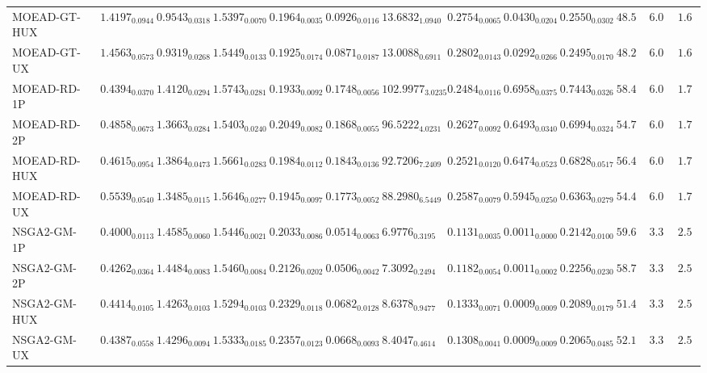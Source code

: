 \documentclass[11pt,a4paper]{article}
\begin{document}
\begin{table}[H]
{\begin{tabular}{lcccccccccccc}
MOEAD-GT-HUX & $1.4197_{0.0944}$ & $0.9543_{0.0318}$ & $1.5397_{0.0070}$ & $0.1964_{0.0035}$ & $0.0926_{0.0116}$ & $13.6832_{1.0940}$ & $0.2754_{0.0065}$ & $0.0430_{0.0204}$ & $0.2550_{0.0302}$ & $48.56$ & $6.00$ & $\mathbf{1.67}$ \\
MOEAD-GT-UX & $1.4563_{0.0573}$ & $0.9319_{0.0268}$ & $1.5449_{0.0133}$ & $0.1925_{0.0174}$ & $0.0871_{0.0187}$ & $13.0088_{0.6911}$ & $0.2802_{0.0143}$ & $0.0292_{0.0266}$ & $0.2495_{0.0170}$ & $48.22$ & $6.00$ & $\mathbf{1.67}$ \\
MOEAD-RD-1P & $0.4394_{0.0370}$ & $1.4120_{0.0294}$ & $1.5743_{0.0281}$ & $0.1933_{0.0092}$ & $0.1748_{0.0056}$ & $102.9977_{3.0235}$ & $0.2484_{0.0116}$ & $0.6958_{0.0375}$ & $0.7443_{0.0326}$ & $58.44$ & $6.00$ & $1.78$ \\
MOEAD-RD-2P & $0.4858_{0.0673}$ & $1.3663_{0.0284}$ & $1.5403_{0.0240}$ & $0.2049_{0.0082}$ & $0.1868_{0.0055}$ & $96.5222_{4.0231}$ & $0.2627_{0.0092}$ & $0.6493_{0.0340}$ & $0.6994_{0.0324}$ & $54.78$ & $6.00$ & $1.78$ \\
MOEAD-RD-HUX & $0.4615_{0.0954}$ & $1.3864_{0.0473}$ & $1.5661_{0.0283}$ & $0.1984_{0.0112}$ & $0.1843_{0.0136}$ & $92.7206_{7.2409}$ & $0.2521_{0.0120}$ & $0.6474_{0.0523}$ & $0.6828_{0.0517}$ & $56.44$ & $6.00$ & $1.78$ \\
MOEAD-RD-UX & $0.5539_{0.0540}$ & $1.3485_{0.0115}$ & $1.5646_{0.0277}$ & $0.1945_{0.0097}$ & $0.1773_{0.0052}$ & $88.2980_{6.5449}$ & $0.2587_{0.0079}$ & $0.5945_{0.0250}$ & $0.6363_{0.0279}$ & $54.44$ & $6.00$ & $1.78$ \\
NSGA2-GM-1P & $0.4000_{0.0113}$ & $1.4585_{0.0060}$ & $1.5446_{0.0021}$ & $0.2033_{0.0086}$ & $0.0514_{0.0063}$ & $6.9776_{0.3195}$ & $0.1131_{0.0035}$ & $\mathbf{0.0011}_{0.0000}$ & $0.2142_{0.0100}$ & $59.67$ & $3.33$ & $2.56$ \\
NSGA2-GM-2P & $0.4262_{0.0364}$ & $1.4484_{0.0083}$ & $1.5460_{0.0084}$ & $0.2126_{0.0202}$ & $0.0506_{0.0042}$ & $7.3092_{0.2494}$ & $0.1182_{0.0054}$ & $\mathbf{0.0011}_{0.0002}$ & $0.2256_{0.0230}$ & $58.78$ & $3.33$ & $2.56$ \\
NSGA2-GM-HUX & $0.4414_{0.0105}$ & $1.4263_{0.0103}$ & $1.5294_{0.0103}$ & $0.2329_{0.0118}$ & $0.0682_{0.0128}$ & $8.6378_{0.9477}$ & $0.1333_{0.0071}$ & $\mathbf{0.0009}_{0.0009}$ & $0.2089_{0.0179}$ & $51.44$ & $3.33$ & $2.56$ \\
NSGA2-GM-UX & $0.4387_{0.0558}$ & $1.4296_{0.0094}$ & $1.5333_{0.0185}$ & $0.2357_{0.0123}$ & $0.0668_{0.0093}$ & $8.4047_{0.4614}$ & $0.1308_{0.0041}$ & $\mathbf{0.0009}_{0.0009}$ & $0.2065_{0.0485}$ & $52.11$ & $3.33$ & $2.56$ \\

\end{tabular}}
\end{table}
\end{document}
